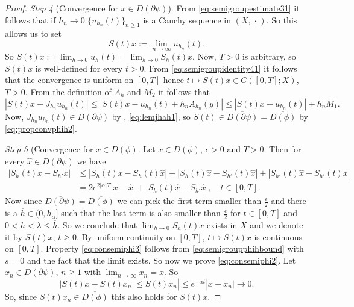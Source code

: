 \documentclass[a4paper,11pt, leqno]{scrreprt} %
\renewcommand{\leq}{\leqslant}
\renewcommand{\leq}{\leqslant}
\renewcommand{\geq}{\geqslant}
\theoremstyle{change}
\theoremstyle{nonumberplain}
\newtheorem{proof}{Proof}
\begin{document}
\begin{proof}
  \textit{Step 4} (Convergence for $x \in D(\partial \psi)$). From
  \eqref{eq:semigroupestimate31} it follows that if $h_n \to 0$
  $\{u_{h_n}(t) \}_{n \geq 1}$ is a Cauchy sequence in $(X,
  |\cdot|)$. So this allows us to set
  \begin{equation}
    \label{eq:semigroupidentity41}
    S(t)x := \lim_{n \to \infty} u_{h_n}(t).
  \end{equation}
  So $S(t) x := \lim_{h \to 0} u_h(t) = \lim_{h \to 0} S_h(t) x$. Now,
  $T > 0$ is arbitrary, so $S(t) x$ is well-defined for every $t >
  0$. From \eqref{eq:semigroupidentity41} it follows that the
  convergence is uniform on $[0, T]$ hence $t \mapsto S(t)x \in
  C([0,T]; X)$, $T > 0$. From the definition of $A_h$ and $M_2$ it
  follows that
  \begin{equation*}
    |S(t)x - J_{h_n} u_{h_n}(t)| \leq |S(t)x - u_{h_n}(t) + h_n
    A_{h_n}(y)| \leq |S(t)x - u_{h_n}(t)| + h_n M_1.
  \end{equation*}
  Now, $J_{h_n} u_{h_n}(t) \in D(\partial \psi)$ by
  , \eqref{eq:lemjhah1}, so $S(t) \in
  \overline{D(\partial \psi)} = \overline{D(\phi)}$ by
  \eqref{eq:propconvphih2}.

  \textit{Step 5} (Convergence for $x \in \overline{D(\phi)}$. Let $x
  \in \overline{D(\phi)}$, $\epsilon > 0$ and $T > 0$. Then for every
  $\hat x \in D(\partial \psi)$ we have
  \begin{equation*}
    \begin{split}
      |S_h(t) x - S_{h'} x| &\leq |S_h(t) x - S_h(t) \hat x| + |S_h(t)
      \hat x - S_{h'}(t) \hat x| + |S_{h'}(t) \hat x - S_{h'}(t) x|\\
      &=2 e^{2 |\alpha| T} |x - \hat x| + |S_h(t) \hat x - S_{h'} \hat
      x|, \quad t \in [0,T].
    \end{split}
  \end{equation*}
  Now since $\overline{D(\partial \psi)} = \overline{D(\phi)}$ we can
  pick the first term smaller than $\frac\epsilon2$ and there is a
  $\overline{h} \in (0, h_\alpha]$ such that the last term is also
  smaller than $\frac\epsilon2$ for $t \in [0,T]$ and $0 < h < \lambda
  \leq \overline{h}$. So we conclude that $\lim_{h \to 0} S_h(t) x$
  exists in $X$ and we denote it by $S(t) x$, $t \geq 0$. By uniform
  continuity on $[0,T]$, $t \mapsto S(t)x$ is continuous on $[0,
  T]$. Property \eqref{eq:consemiphi3} follows from
  \eqref{eq:semigroupphihbound} with $s = 0$ and the fact that the
  limit exists. So now we prove \eqref{eq:consemiphi2}. Let $x_n \in
  D(\partial \psi)$, $n \geq 1$ with $\lim_{n \to \infty} x_n = x$. So
  \begin{equation*}
    |S(t) x - S(t) x_n| \leq S(t)x_n| \leq e^{-\alpha t} |x - x_n| \to 0.
  \end{equation*}
  So, since $S(t)x_n \in \overline{D(\phi)}$ this also holds for $S(t)
  x$.


\end{proof}
\end{document}
